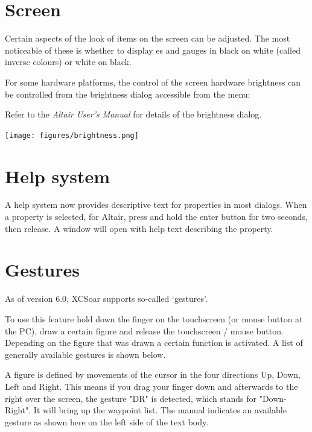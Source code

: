 \section{Screen}

Certain aspects of the look of items on the screen can be adjusted.
The most noticeable of these is whether to display {\InfoBox}es and
gauges in black on white (called inverse colours) or white on black.

For some hardware platforms, the control of the screen hardware 
brightness can be controlled from the brightness dialog
accessible from the menu:
\begin{quote}
\blink{}\blink{}
\end{quote}

Refer to the {\em Altair User's Manual} for details of the brightness
dialog.

\begin{center}
\texttt{[image: figures/brightness.png]}
\end{center}

\section{Help system}
A help system now provides descriptive text for properties in
most dialogs.  When a property is selected, for Altair, press and hold the
enter button for two seconds, then release.  A window will open with
help text describing the property.

\section{Gestures}\label{sec:gestures}
As of version 6.0, XCSoar supports so-called `gestures'.

To use this feature hold down the finger on the 
touchscreen (or mouse button at the PC), draw a certain figure and release the touchscreen / mouse button. Depending on the figure that was drawn 
a certain function is activated. A list of generally available gestures is 
shown below. 

A figure is defined by movements of the 
cursor in the four directions Up, Down, Left and Right. This means if 
you drag your finger down and afterwards to the right over the screen,  the gesture "DR" is detected,
which stands for "Down-Right". It will bring up the waypoint list. The manual indicates an available gesture as shown here on the left side of the text body.

